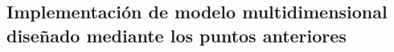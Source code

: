 \medskip
\subsection{Implementación de modelo multidimensional diseñado mediante los puntos anteriores}
